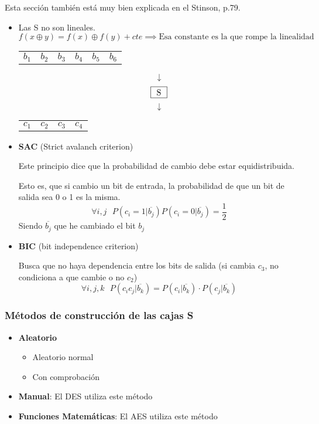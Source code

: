 Esta sección también está muy bien explicada en el Stinson, p.79.

\begin{itemize}
	\item Las S no son lineales.
	$$f(x \oplus y) = f(x) \oplus f(y) + cte \implies \text{Esa constante es la que rompe la linealidad}$$
	
	\begin{example}
		\begin{center}
			\begin{tabular}{r  r  r  r  r  r }
				$b_1$ & $b_2$ & $b_3$ & $b_4$ & $b_5$ & $b_6$
			\end{tabular}
		\end{center}
		$$\downarrow$$
		$$\fbox{\textbf{     }S\textbf{     }}$$
		$$\downarrow$$
		\begin{center}
			\begin{tabular}{r  r  r  r }
				$c_1$ & $c_2$ & $c_3$ & $c_4$
			\end{tabular}
		\end{center}
		
		
	\end{example}
	
	\item \textbf{SAC} (Strict avalanch criterion)
	
	Este principio dice que la probabilidad de cambio debe estar equidistribuida.
	
	Esto es, que si cambio un bit de entrada, la probabilidad de que un bit de salida sea 0 o 1 es la misma.
	$$\forall i,j\text{  }P(c_i=1|\overline{b_j})  P(c_i=0|\overline{b_j}) = \frac{1}{2}$$
	Siendo $\overline{b_j}$ que he cambiado el bit $b_j$
	
	\item \textbf{BIC} (bit independence criterion)
	
	Busca que no haya dependencia entre los bits de salida (si cambia $c_3$, no condiciona a que cambie o no $c_2$) 
	$$\forall i,j,k \text{  } P(c_ic_j|\overline{b_k}) = P(c_i|\overline{b_k})\cdot P(c_j|\overline{b_k})$$
	
\end{itemize} 

\subsubsection{Métodos de construcción de las cajas S}
 \begin{itemize}
 	\item \textbf{Aleatorio}
 	\begin{itemize}
 		\item Aleatorio normal
 		\item Con comprobación
 	\end{itemize}
 	\item \textbf{Manual}: El DES utiliza este método
 	\item \textbf{Funciones Matemáticas}: El AES utiliza este método
 \end{itemize}
 
